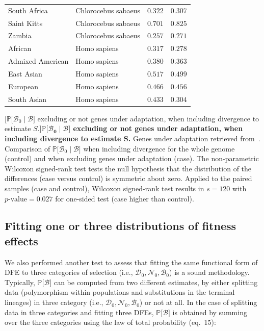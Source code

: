\documentclass{article}
\newcommand{\proba}{\mathbb{P}}
\newcommand{\SphyDel}{\mathcal{D}_0}
\newcommand{\SphyNeu}{\mathcal{N}_0}
\newcommand{\SphyBen}{\mathcal{B}_0}
\newcommand{\given}{\mid}
\newcommand{\Spop}{S}
\newcommand{\SpopBen}{\mathcal{B}}
\newcommand{\pvalue}{p\text{-value}}
\begin{document}
\begin{center}
\begin{tabular}{|l|l|r|r|}
            \rowcolor{LIGHTGREY} South Africa & Chlorocebus sabaeus & $ 0.322$ & $ 0.307$ \\
            \rowcolor{LIGHTGREY} Saint Kitts & Chlorocebus sabaeus & $ 0.701$ & $ 0.825$ \\
            \rowcolor{LIGHTGREY} Zambia & Chlorocebus sabaeus & $ 0.257$ & $ 0.271$ \\
            African & Homo sapiens & $ 0.317$ & $ 0.278$ \\
            Admixed American & Homo sapiens & $ 0.380$ & $ 0.363$ \\
            East Asian & Homo sapiens & $ 0.517$ & $ 0.499$ \\
            European & Homo sapiens & $ 0.466$ & $ 0.456$ \\
            South Asian & Homo sapiens & $ 0.433$ & $ 0.304$ \\
            \bottomrule
        \end{tabular}
        [$\proba{[}\SphyBen\given \SpopBen {]}$ excluding or not genes under adaptation, when including divergence to estimate $\Spop$.]{\textbf{$\bm{\proba{[}\SphyBen\given \SpopBen {]}}$ excluding or not genes under adaptation, when including divergence to estimate $\bm{\Spop}$.}
        Genes under adaptation retrieved from~\cite{latrille_genes_2023}.
        Comparison of $\proba{[}\SphyBen\given \SpopBen {]}$ when including divergence for the whole genome (control) and when excluding genes under adaptation (case).
        The non-parametric Wilcoxon signed-rank test tests the null hypothesis that the distribution of the differences (case versus control) is symmetric about zero.
        Applied to the paired samples (case and control), Wilcoxon signed-rank test results in $s=120$ with $\pvalue=0.027$ for one-sided test (case higher than control).\label{table:no-adaptation-div}
        }
    \end{center}


    \newpage
    \subsection{Fitting one or three distributions of fitness effects}

    We also performed another test to assess that fitting the same functional form of DFE to three categories of selection (i.e., $\SphyDel, \SphyNeu, \SphyBen$) is a sound methodology.
    Typically, $\proba{[} \SpopBen {]}$ can be computed from two different estimates, by either splitting data (polymorphism within populations and substitutions in the terminal lineages) in three category (i.e., $\SphyDel, \SphyNeu, \SphyBen$) or not at all.
    In the case of splitting data in three categories and fitting three DFEs, $\proba{[} \SpopBen {]}$ is obtained by summing over the three categories using the law of total probability (eq.\ 15):
\end{document}
